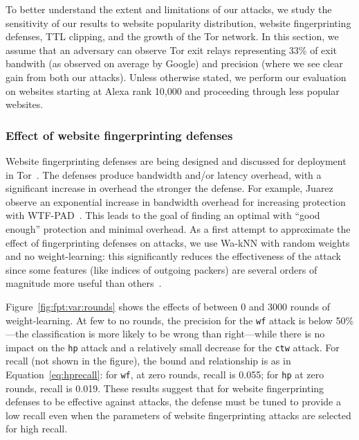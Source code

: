 To better understand the extent and limitations of our attacks, we
study the sensitivity of our results to website popularity distribution,
website fingerprinting defenses, TTL clipping, and the growth of the Tor
network.  In this section, we assume that an adversary can observe Tor
exit relays representing 33\% of exit bandwith (as observed on average
by Google) and precision (where we see clear gain from both our
attacks).  Unless otherwise stated, we perform our evaluation on
websites starting at Alexa rank 10,000 and proceeding through less
popular websites.



\subsubsection{Effect of website fingerprinting defenses}

Website fingerprinting defenses are being
designed and discussed for deployment in Tor~\cite{adapativepadding}.
The defenses produce bandwidth and/or latency overhead, with a significant
increase in overhead the stronger the defense. For example, Juarez \ea
observe an exponential increase in bandwidth overhead for increasing protection
with WTF-PAD~\cite{DBLP:journals/corr/JuarezIPDW15}.
This leads to the goal of finding an optimal with ``good enough''
protection and minimal overhead.
As a first attempt to approximate the effect of fingerprinting
defenses on \name attacks, we use Wa-kNN with
random weights and no weight-learning: this significantly reduces the
effectiveness of the attack since some features (like indices of outgoing
packers) are several orders of magnitude more useful
than others~\cite{DBLP:journals/corr/JuarezIPDW15}.

Figure~\ref{fig:fpt:var:rounds} shows the effects of between 0 and 3000
rounds of weight-learning. At few to no rounds, the precision for the
\texttt{wf} attack is below 50\%---the classification is more likely to be wrong
than right---while there is no impact on the \texttt{hp} attack and a relatively
small decrease for the \texttt{ctw} attack.
For recall (not shown in the figure), the bound and relationship is
as in Equation~\ref{eq:hprecall}: for \texttt{wf}, at zero rounds, recall is
0.055; for \texttt{hp} at zero rounds, recall is 0.019. These results suggest
that for website fingerprinting defenses to be effective against \name attacks,
the defense must be tuned to provide a low recall even when the parameters of
website fingerprinting attacks are selected for high recall.

